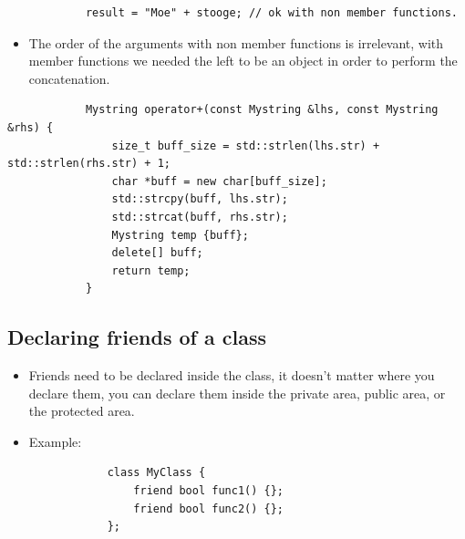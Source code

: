 \begin{itemize}
\begin{verbatim}
            result = "Moe" + stooge; // ok with non member functions.
        \end{verbatim}
        \begin{itemize}
            \item The order of the arguments with non member functions is irrelevant, with member functions we needed the left to be an object in order to perform the concatenation.
        \end{itemize}
        \begin{verbatim}
            Mystring operator+(const Mystring &lhs, const Mystring &rhs) {
                size_t buff_size = std::strlen(lhs.str) + std::strlen(rhs.str) + 1;
                char *buff = new char[buff_size];
                std::strcpy(buff, lhs.str);
                std::strcat(buff, rhs.str);
                Mystring temp {buff};
                delete[] buff;
                return temp;
            }
        \end{verbatim}
\end{itemize}

\subsection{Declaring friends of a class}
\begin{itemize}
    \item Friends need to be declared inside the class, it doesn't matter where you declare them, you can declare them inside the private area, public area, or the protected area.
    \item Example:
        \begin{verbatim}
            class MyClass {
                friend bool func1() {};
                friend bool func2() {};
            };
        \end{verbatim}
\end{itemize}

